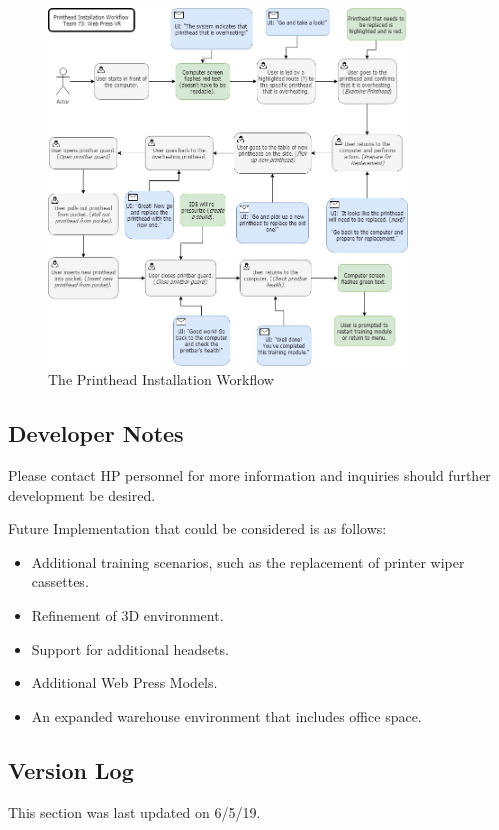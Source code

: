 \documentclass[onecolumn, draftclsnofoot,10pt, compsoc]{IEEEtran}
\begin{document}
\begin{figure}[ht!]
    \centering
    \includegraphics[width=0.85\textwidth]{PrintheadInstallationWorkflow.jpg}
    \caption{The Printhead Installation Workflow}
    \label{fig:workflow}
\end{figure}
\subsection{Developer Notes}

Please contact HP personnel for more information and inquiries should further development be desired.

Future Implementation that could be considered is as follows: 
\begin{itemize}
    \item Additional training scenarios, such as the replacement of printer wiper cassettes.
    \item Refinement of 3D environment.
    \item Support for additional headsets.
    \item Additional Web Press Models. 
    \item An expanded warehouse environment that includes office space.
\end{itemize}

\subsection{Version Log}
This section was last updated on 6/5/19.
\end{document}
